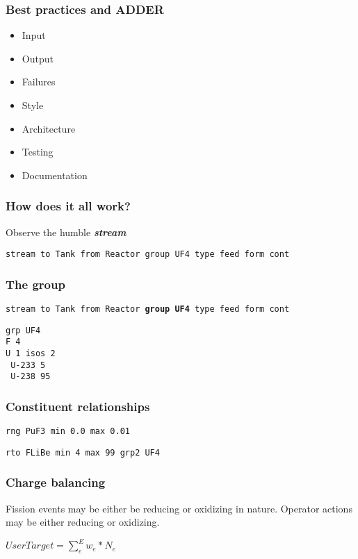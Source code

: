 \documentclass{beamer}
\begin{document}
\begin{frame}
\frametitle{Best practices and ADDER}

    \begin{itemize}
        \item Input
        \item Output
        \item Failures
        \item Style
        \item Architecture
        \item Testing
        \item Documentation
    \end{itemize}

\end{frame}

\begin{frame}
\frametitle{How does it all work?}

Observe the humble \textbf{\textit{stream}}

\hspace{2cm}

\small{\texttt{stream to Tank from Reactor group UF4 type feed form cont}}

\end{frame}

\begin{frame}
\frametitle{The group}

\small{\texttt{stream to Tank from Reactor \textbf{group UF4} type feed form cont}}

\hspace{2cm}

\texttt{grp UF4}\\
\texttt{F   4}\\
\texttt{U   1   isos    2}\\
\texttt{    U-233    5}\\
\texttt{    U-238   95}

\end{frame}

\begin{frame}
\frametitle{Constituent relationships}

\texttt{rng PuF3    min 0.0 max 0.01}

\hspace{2cm}

\texttt{rto FLiBe   min 4   max 99  grp2    UF4}

\end{frame}

\begin{frame}
\frametitle{Charge balancing}

Fission events may be either be reducing or oxidizing in nature. Operator
actions may be either reducing or oxidizing.

\hspace{2cm}

$UserTarget = \sum\limits_{e}^{E}w_{e}*N_{e}$

\end{frame}
\end{document}
